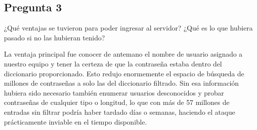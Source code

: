 \subsection{Pregunta 3}

¿Qué ventajas se tuvieron para poder ingresar al servidor? ¿Qué es lo que hubiera pasado si no las hubieran tenido?

\begin{respuesta}
La ventaja principal fue conocer de antemano el nombre de usuario asignado a nuestro equipo y tener la certeza de que la contraseña estaba dentro del diccionario proporcionado. Esto redujo enormemente el espacio de búsqueda de millones de contraseñas a solo las del diccionario filtrado. Sin esa información hubiera sido necesario también enumerar usuarios desconocidos y probar contraseñas de cualquier tipo o longitud, lo que con más de 57 millones de entradas sin filtrar podría haber tardado días o semanas, haciendo el ataque prácticamente inviable en el tiempo disponible.

    
\end{respuesta}
